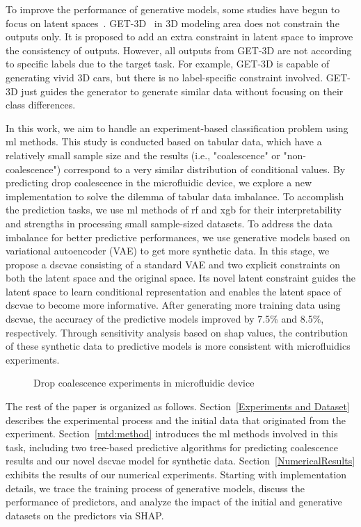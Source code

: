 \documentclass[twoside,twocolumn,9pt]{article}
\begin{document}
To improve the performance of generative models, some studies have begun to focus on latent spaces~\cite{gelada2019deepmdp, bojanowski2018optimizing}. GET-3D~\cite{gao2022get3d} in 3D modeling area does not constrain the outputs only. It is proposed to add an extra constraint in latent space to improve the consistency of outputs. However, all outputs from GET-3D are not according to specific labels due to the target task. For example, GET-3D is capable of generating vivid 3D cars, but there is no label-specific constraint involved. GET-3D just guides the generator to generate similar data without focusing on their class differences. 

In this work, we aim to handle an experiment-based classification problem using \acrshort*{ml} methods. This study is conducted based on tabular data, which have a relatively small sample size and the results (i.e., "coalescence" or "non-coalescence") correspond to a very similar distribution of conditional values. By predicting drop coalescence in the microfluidic device, we explore a new implementation to solve the dilemma of tabular data imbalance. To accomplish the prediction tasks, we use \acrshort*{ml} methods of \acrshort*{rf} and \acrlong*{xgb} for their interpretability and strengths in processing small sample-sized datasets. To address the data imbalance for better predictive performances, we use generative models based on variational autoencoder (VAE) to get more synthetic data. In this stage, we propose a \acrfull*{dscvae} consisting of a standard VAE and two explicit constraints on both the latent space and the original space. Its novel latent constraint guides the latent space to learn conditional representation and enables the latent space of \acrshort*{dscvae} to become more informative. After generating more training data using \acrshort*{dscvae}, the accuracy of the predictive models improved by 7.5\% and 8.5\%, respectively. Through sensitivity analysis based on \acrfull*{shap} values, the contribution of these synthetic data to predictive models is more consistent with microfluidics experiments.
\begin{figure*}[!htb]
    \centering
    \caption{Drop coalescence experiments in microfluidic device}
    \label{fig:experiment}
\end{figure*}

The rest of the paper is organized as follows. 
Section~\ref{Experiments and Dataset} describes the experimental process and the initial data that originated from the experiment. Section~\ref{mtd:method} introduces the \acrlong*{ml} methods involved in this task, including two tree-based predictive algorithms for predicting coalescence results and our novel \acrshort*{dscvae} model for synthetic data. Section~\ref{NumericalResults} exhibits the results of our numerical experiments. Starting with implementation details, we trace the training process of generative models, discuss the performance of predictors, and analyze the impact of the initial and generative datasets on the predictors via SHAP.
\end{document}
